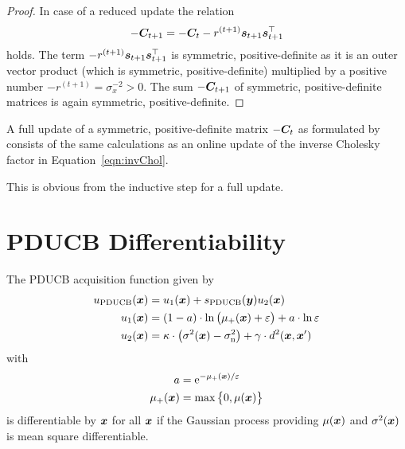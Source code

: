\begin{proof}
    In case of a reduced update the relation
    \begin{equation*}
        -\bm{C}_{t+1} = -\bm{C}_t - r^{(t+1)} \bm{s}_{t+1} \bm{s}_{t+1}^{\top}
    \end{equation*}
    holds. The term $- r^{(t+1)} \bm{s}_{t+1} \bm{s}_{t+1}^{\top}$ is symmetric, 
    positive-definite as it is an outer vector product (which is symmetric, 
    positive-definite) multiplied by a positive number $-r^{(t+1)} 
    = \sigma_x^{-2} > 0$. The sum $-\bm{C}_{t+1}$ of symmetric, 
    positive-definite matrices is again symmetric, positive-definite.
\end{proof}

\begin{corollary}
    A full update of a symmetric, positive-definite matrix $-\bm{C}_t$ as 
    formulated by \textcite[equation~2.9]{Csato:2002fp} consists of the same 
    calculations as an online update of the inverse Cholesky factor in 
    Equation~\ref{eqn:invChol}.
\end{corollary}
This is obvious from the inductive step for a full update.

\chapter{PDUCB Differentiability}\label{sec:pducb-diff}
\begin{theorem}
    The PDUCB acquisition function given by
    \begin{align*}
    u\ped{PDUCB}(\vc x) &= u_1(\vc x) + s\ped{PDUCB}(\vc y) u_2(\vc x) \\
    u_1(\vc x) &= \del{1 - a} \cdot \ln\del{\mu_+(\vc x) + \varepsilon} 
    + a \cdot \ln \varepsilon \\
    u_2(\vc x) &= \kappa \cdot \del[1]{\sigma^2(\vc x) - \sigma\ped{n}^2} 
    + \gamma \cdot d^2(\vc x, \vc x')
    \end{align*}
    with
    \begin{align*}
    a &= \e^{-\mu_+(\vc x) / \varepsilon} \\
    \mu_+(\vc x) &= \max\cbr{0, \mu(\vc x)}
    \end{align*}
    is differentiable by $\bm{x}$ for all $\bm{x}$ if the Gaussian process 
    providing $\mu(\bm{x})$ and $\sigma^2(\bm{x})$ is mean square differentiable.
\end{theorem}

